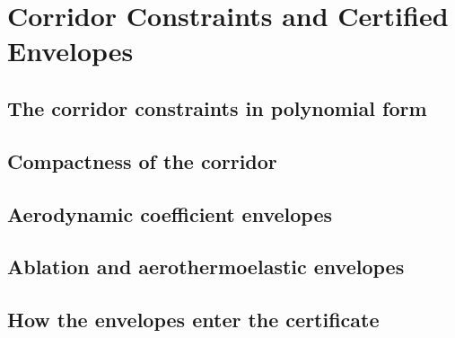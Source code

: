 
\section{Corridor Constraints and Certified Envelopes}
\label{apx:constraints}

\subsection{The corridor constraints in polynomial form}
\label{sub:apx_corridor_polynomial}

\subsection{Compactness of the corridor}
\label{sub:apx_corridor_compactness}

\subsection{Aerodynamic coefficient envelopes}
\label{sub:apx_aero_envelopes}

\subsection{Ablation and aerothermoelastic envelopes}
\label{sub:apx_coupling_envelopes}

\subsection{How the envelopes enter the certificate}
\label{sub:apx_envelopes_in_certificate}
